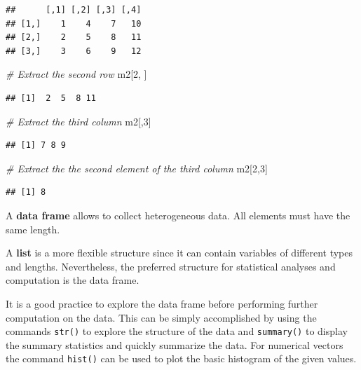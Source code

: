 \documentclass[
]{article}
\newenvironment{Shaded}{\begin{snugshade}}{\end{snugshade}}
\newcommand{\CommentTok}[1]{\textcolor[rgb]{0.56,0.35,0.01}{\textit{#1}}}
\newcommand{\DecValTok}[1]{\textcolor[rgb]{0.00,0.00,0.81}{#1}}
\newcommand{\NormalTok}[1]{#1}
\begin{document}
\begin{verbatim}
##      [,1] [,2] [,3] [,4]
## [1,]    1    4    7   10
## [2,]    2    5    8   11
## [3,]    3    6    9   12
\end{verbatim}

\begin{Shaded}
\begin{Highlighting}[]
\CommentTok{\# Extract the second row}
\NormalTok{m2[}\DecValTok{2}\NormalTok{, ]}
\end{Highlighting}
\end{Shaded}

\begin{verbatim}
## [1]  2  5  8 11
\end{verbatim}

\begin{Shaded}
\begin{Highlighting}[]
\CommentTok{\# Extract the third column}
\NormalTok{m2[,}\DecValTok{3}\NormalTok{]}
\end{Highlighting}
\end{Shaded}

\begin{verbatim}
## [1] 7 8 9
\end{verbatim}

\begin{Shaded}
\begin{Highlighting}[]
\CommentTok{\# Extract the the second element of the third column}
\NormalTok{m2[}\DecValTok{2}\NormalTok{,}\DecValTok{3}\NormalTok{]}
\end{Highlighting}
\end{Shaded}

\begin{verbatim}
## [1] 8
\end{verbatim}

A \textbf{data frame} allows to collect heterogeneous data.
All elements must have the same length.

A \textbf{list} is a more flexible structure since it can contain variables of different types and lengths.
Nevertheless, the preferred structure for statistical analyses and computation is the data frame.

It is a good practice to explore the data frame before performing further computation on the data.
This can be simply accomplished by using the commands \texttt{str()} to explore the structure of the data and \texttt{summary()} to display the summary statistics and quickly summarize the data.
For numerical vectors the command \texttt{hist()} can be used to plot the basic histogram of the given values.
\end{document}
